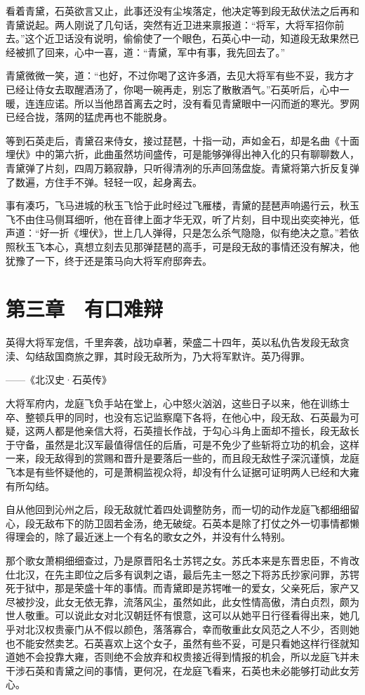 看着青黛，石英欲言又止，此事还没有尘埃落定，他决定等到段无敌伏法之后再和青黛说起。两人刚说了几句话，突然有近卫进来禀报道：“将军，大将军招你前去。”这个近卫话没有说明，偷偷使了一个眼色，石英心中一动，知道段无敌果然已经被抓了回来，心中一喜，道：“青黛，军中有事，我先回去了。”

青黛微微一笑，道：“也好，不过你喝了这许多酒，去见大将军有些不妥，我方才已经让侍女去取醒酒汤了，你喝一碗再走，别忘了散散酒气。”石英听后，心中一暖，连连应诺。所以当他昂首离去之时，没有看见青黛眼中一闪而逝的寒光。罗网已经合拢，落网的猛虎再也不能脱身。

等到石英走后，青黛召来侍女，接过琵琶，十指一动，声如金石，却是名曲《十面埋伏》中的第六折，此曲虽然坊间盛传，可是能够弹得出神入化的只有聊聊数人，青黛弹了片刻，四周万籁寂静，只听得清冽的乐声回荡盘旋。青黛将第六折反复弹了数遍，方住手不弹。轻轻一叹，起身离去。

事有凑巧，飞马进城的秋玉飞恰于此时经过飞雁楼，青黛的琵琶声响遏行云，秋玉飞不由住马侧耳细听，他在音律上面才华无双，听了片刻，目中现出奕奕神光，低声道：“好一折《埋伏》，世上几人弹得，只是怎么杀气隐隐，似有绝决之意。”若依照秋玉飞本心，真想立刻去见那弹琵琶的高手，可是段无敌的事情还没有解决，他犹豫了一下，终于还是策马向大将军府邸奔去。

\chapter{第三章　有口难辩}

英得大将军宠信，千里奔袭，战功卓著，荣盛二十四年，英以私仇告发段无敌贪渎、勾结敌国商旅之罪，其时段无敌所为，乃大将军默许。英乃得罪。

——《北汉史·石英传》

大将军府内，龙庭飞负手站在堂上，心中怒火汹汹，这些日子以来，他在训练士卒、整顿兵甲的同时，也没有忘记监察麾下各将，在他心中，段无敌、石英最为可疑，这两人都是他亲信大将，石英擅长作战，于勾心斗角上面却不擅长，段无敌长于守备，虽然是北汉军最值得信任的后盾，可是不免少了些斩将立功的机会，这样一来，段无敌得到的赏赐和晋升是要落后一些的，而且段无敌性子深沉谨慎，龙庭飞本是有些怀疑他的，可是萧桐监视众将，却没有什么证据可证明两人已经和大雍有所勾结。

自从他回到沁州之后，段无敌就忙着四处调整防务，而一切的动作龙庭飞都细细留心，段无敌布下的防卫固若金汤，绝无破绽。石英本是除了打仗之外一切事情都懒得理会的，除了最近迷上一个有名的歌女之外，并没有什么特别。

那个歌女萧桐细细查过，乃是原晋阳名士苏锷之女。苏氏本来是东晋忠臣，不肯改仕北汉，在先主即位之后多有讽刺之语，最后先主一怒之下将苏氏抄家问罪，苏锷死于狱中，那是荣盛十年的事情。而青黛即是苏锷唯一的爱女，父亲死后，家产又尽被抄没，此女无依无靠，流落风尘，虽然如此，此女性情高傲，清白贞烈，颇为世人敬重。可以说此女对北汉朝廷怀有恨意，这可以从她平日行径看得出来，她几乎对北汉权贵豪门从不假以颜色，落落寡合，幸而敬重此女风范之人不少，否则她也不能安然卖艺。石英喜欢上这个女子，虽然有些不妥，可是只看她这样行径就知道她不会投靠大雍，否则绝不会放弃和权贵接近得到情报的机会，所以龙庭飞并未干涉石英和青黛之间的事情，更何况，在龙庭飞看来，石英也未必能够打动此女芳心。

